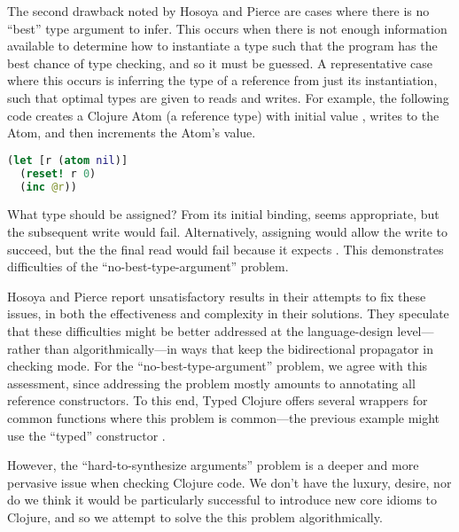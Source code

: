 The second drawback noted by Hosoya and Pierce are
cases where there is no ``best'' type argument to infer.
This occurs when there is not enough information available
to determine how to instantiate a type such that the program
has the best chance of type checking, and so it must be guessed.
A representative case where this occurs is inferring the
type of a reference from just its instantiation, such
that optimal types are given to reads and writes.
For example, the following code creates a Clojure Atom
(a reference type) with initial value , writes
 to the Atom, and then increments the Atom's value.

{
\begin{lstlisting}[language=Clojure]
(let [r (atom nil)]
  (reset! r 0)
  (inc @r))
\end{lstlisting}
}

What type should  be assigned? From its initial binding,
 seems appropriate, but the subsequent write
would fail. Alternatively, assigning  would
allow the write to succeed, but the the final read would fail
because it expects .
This demonstrates difficulties of the ``no-best-type-argument'' problem.

Hosoya and Pierce report unsatisfactory results in their attempts to
fix these issues, in both the effectiveness and complexity
in their solutions.
They speculate that these difficulties might be better 
addressed at the language-design level---rather than algorithmically---in ways that
keep the bidirectional propagator in checking mode.
For the ``no-best-type-argument'' problem,
we agree with this assessment, since
addressing the problem mostly amounts to annotating 
all reference constructors.
To this end,
Typed Clojure offers several
wrappers for common functions where this problem
is common---the previous example might use the ``typed''
constructor .

However, the ``hard-to-synthesize arguments'' problem
is a deeper and more pervasive issue when checking Clojure code.
We don't have the luxury, desire, nor do we think it would be particularly
successful to introduce new core idioms to Clojure,
and so we attempt to solve the this problem algorithmically.


